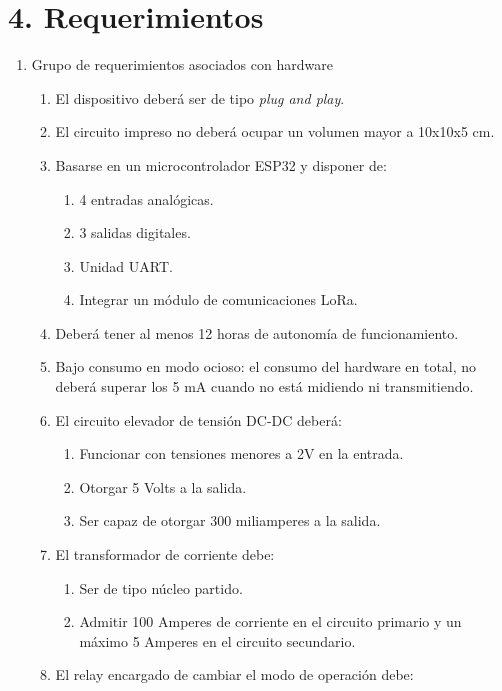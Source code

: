 \documentclass[11pt]{charter}
\begin{document}
\section{4. Requerimientos}
\label{sec:requerimientos}
\begin{enumerate}
\item Grupo de requerimientos asociados con hardware
	\begin{enumerate}
	\item El dispositivo deberá ser de tipo \textit{plug and play}.
	\item El circuito impreso no deberá ocupar un volumen mayor a 10x10x5 cm.
	\item Basarse en un microcontrolador ESP32 y disponer de:
	\begin{enumerate}[label*=\arabic*.]
		\item 4 entradas analógicas.
		\item 3 salidas digitales.
		\item Unidad UART.
		\item Integrar un módulo de comunicaciones LoRa.
	\end{enumerate}
	\item Deberá tener al menos 12 horas de autonomía de funcionamiento.
	\item Bajo consumo en modo ocioso: el consumo del hardware en total, no deberá superar los 5 mA cuando no está midiendo ni transmitiendo.
	\item El circuito elevador de tensión DC-DC deberá:
	\begin{enumerate}[label*=\arabic*.]
		\item Funcionar con tensiones menores a 2V en la entrada.
		\item Otorgar 5 Volts a la salida.
		\item Ser capaz de otorgar 300 miliamperes a la salida.
	\end{enumerate}
	\item El transformador de corriente debe:
	\begin{enumerate}[label*=\arabic*.]
		\item Ser de tipo núcleo partido.
		\item Admitir 100 Amperes de corriente en el circuito primario y un máximo 5 Amperes en el circuito secundario.
	\end{enumerate}
	\item \label{req_relay} El relay encargado de cambiar el modo de operación debe:
	\begin{enumerate}[label*=\arabic*.]

\end{enumerate}
\end{enumerate}
\end{enumerate}
\end{document}
